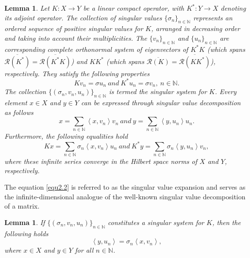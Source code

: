 \documentclass[a4paper,12pt]{article}
\newtheorem{lemma}[theorem]{Lemma}
\numberwithin{equation}{section}
\begin{document}
\begin{lemma}\label{lem2.5}
    Let $K:X\rightarrow Y$ be a linear compact operator, with $K^{*}:Y\rightarrow X$ denoting its adjoint operator. The collection of singular values $\{\sigma_{n}\}_{n\in\mathbb{N}}$ represents an ordered sequence of positive singular values for $K$, arranged in decreasing order and taking into account their multiplicities. The $\{v_{n}\}_{n\in\mathbb{N}}$ and $\{u_{n}\}_{n\in\mathbb{N}}$ are corresponding complete orthonormal system of eigenvectors of $K^{*}K$ (which spans $\overline{\mathcal{R}(K^{*})}=\overline{\mathcal{R}(K^{*}K)}$) and $KK^{*}$ (which spans $\overline{\mathcal{R}(K)}=\overline{\mathcal{R}(KK^{*})}$), respectively. They satisfy the following properties
    \begin{equation}\label{equ2.1}
        Kv_{n}=\sigma u_{n}\ and\ K^{*}u_{n}=\sigma v_{n},\ n\in\mathbb{N}.
    \end{equation}
    The collection $\{(\sigma_{n},v_{n},u_{n})\}_{n\in\mathbb{N}}$ is termed the singular system for $K$. Every element $x\in X$ and $y\in Y$ can be expressed through singular value decomposition as follows
    \begin{equation*}
        x=\sum_{n\in\mathbb{N}}\left<x,v_{n}\right>v_{n}\ and\ y=\sum_{n\in\mathbb{N}}\left<y,u_{n}\right>u_{n}.
    \end{equation*}
    Furthermore, the following equalities hold
    \begin{equation}\label{equ2.2}
        Kx=\sum_{n\in\mathbb{N}}\sigma_{n}\left<x,v_{n}\right>u_{n}\ and\ K^{*}y=\sum_{n\in\mathbb{N}}\sigma_{n}\left<y,u_{n}\right>v_{n},    
    \end{equation}
    where these infinite series converge in the Hilbert space norms of $X$ and $Y$,  respectively. 
\end{lemma}

\par The equation \eqref{equ2.2} is referred to as the singular value expansion and serves as the infinite-dimensional analogue of the well-known singular value decomposition of a matrix.

\begin{lemma}\label{lem2.6}
     If $\{(\sigma_{n},v_{n},u_{n})\}_{n\in\mathbb{N}}$ constitutes a singular system for $K$, then the following holds
    \begin{equation*}
        \left<y,u_{n}\right>=\sigma_{n}\left<x,v_{n}\right>,
    \end{equation*}
    where $x\in X$ and $y\in Y$ for all $n\in\mathbb{N}$.
\end{lemma}
\end{document}
